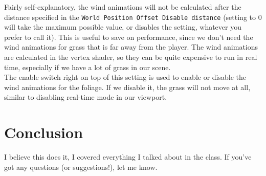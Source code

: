 \documentclass{article}
\begin{document}
	Fairly self-explanatory, the wind animations will not be calculated after the distance specified in the \verb|World Position Offset Disable distance| (setting to 0 will take the maximum possible value, or disables the setting, whatever you prefer to call it). This is useful to save on performance, since we don't need the wind animations for grass that is far away from the player. The wind animations are calculated in the vertex shader, so they can be quite expensive to run in real time, especially if we have a lot of grass in our scene.\\
	The enable switch right on top of this setting is used to enable or disable the wind animations for the foliage. If we disable it, the grass will not move at all, similar to disabling real-time mode in our viewport.

	\section*{Conclusion}
	I believe this does it, I covered everything I talked about in the class. If you've got any questions (or suggestions!), let me know.
	
	
	
\end{document}
